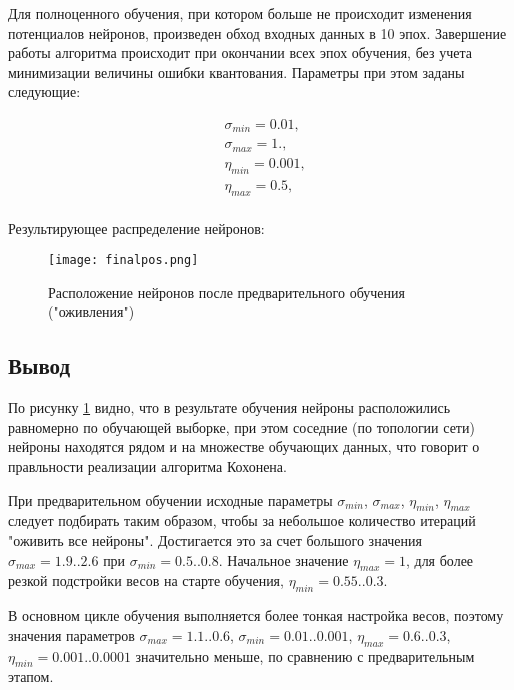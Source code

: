 Для полноценного обучения, при котором больше не происходит изменения потенциалов нейронов, произведен обход входных данных в 10 эпох. Завершение работы алгоритма происходит при окончании всех эпох обучения, без учета минимизации величины ошибки квантования.
Параметры при этом заданы следующие:

\begin{equation}
	\begin{aligned}
	 &	\sigma_{min} = 0.01,  \\ 
	 &	\sigma_{max} = 1., \\	
	 &	\eta_{min} = 0.001,  \\ 
	 &	\eta_{max} = 0.5, \\
	\end{aligned}
\end{equation}

Результирующее распределение нейронов:

\begin{figure}[H]
\centering
\texttt{[image: finalpos.png]}
\caption{Расположение нейронов после предварительного обучения ("оживления")}
\label{img:finalpos}
\end{figure}

\subsection{Вывод}

По рисунку \ref{img:finalpos} видно, что в результате обучения нейроны расположились равномерно по обучающей выборке, при этом соседние (по топологии сети) нейроны находятся рядом и на множестве обучающих данных, что говорит о правльности реализации алгоритма Кохонена.

При предварительном обучении исходные параметры $\sigma_{min}$, $\sigma_{max}$, $\eta_{min}$, $\eta_{max}$ следует подбирать таким образом, чтобы за небольшое количество итераций "оживить все нейроны". Достигается это за счет большого значения $\sigma_{max} = 1.9 .. 2.6 $ при  $\sigma_{min} = 0.5 .. 0.8$. Начальное значение $\eta_{max} = 1$, для более резкой подстройки весов на старте обучения, $\eta_{min} = 0.55 .. 0.3$.

В основном цикле обучения выполняется более тонкая настройка весов, поэтому значения параметров $\sigma_{max} = 1.1 .. 0.6 $,  $\sigma_{min} = 0.01 .. 0.001$, $\eta_{max} = 0.6 .. 0.3$, $\eta_{min} = 0.001 .. 0.0001$ значительно меньше, по сравнению с предварительным этапом.

